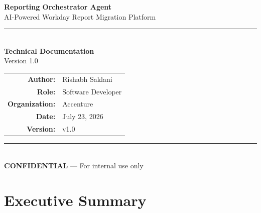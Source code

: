 \documentclass[12pt,a4paper]{article}
\begin{document}
\begin{titlepage}
\centering
\vspace*{2cm}

{\Huge\bfseries\textcolor{sectioncolor}{Reporting Orchestrator Agent}}\\[0.8cm]
{\Large\textcolor{titlegray}{AI-Powered Workday Report Migration Platform}}\\[1.5cm]

\rule{0.8\textwidth}{1pt}\\[1.2cm]

{\large\textbf{Technical Documentation}}\\[0.5cm]
{\large Version 1.0}\\[2cm]

\begin{tabular}{rl}
  \textbf{Author:}        & Rishabh Saklani \\[0.3cm]
  \textbf{Role:}           & Software Developer \\[0.3cm]
  \textbf{Organization:}   & Accenture \\[0.3cm]
  \textbf{Date:}           & July 23, 2026 \\[0.3cm]
  \textbf{Version:}        & v1.0 \\[0.3cm]
\end{tabular}

\vfill

\rule{0.8\textwidth}{0.4pt}\\[0.5cm]
{\small\textcolor{titlegray}{\textbf{CONFIDENTIAL} --- For internal use only}}

\end{titlepage}

\newpage
\tableofcontents
\newpage
\listoffigures
\listoftables
\lstlistoflistings
\newpage

\section{Executive Summary}
\label{sec:executive-summary}
\end{document}
